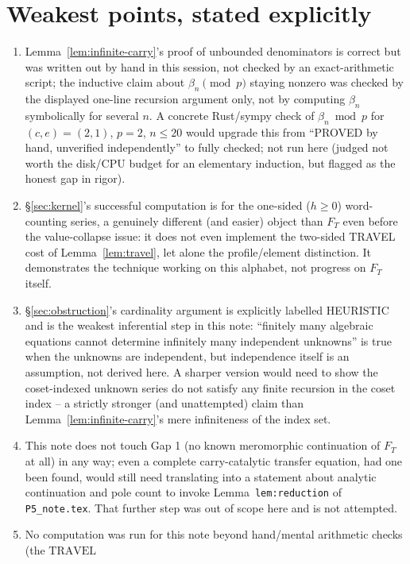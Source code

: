 \documentclass[11pt]{article}
\theoremstyle{remark}
\begin{document}
\section{Weakest points, stated explicitly}\label{sec:weak}

\begin{enumerate}
\item Lemma~\ref{lem:infinite-carry}'s proof of unbounded denominators is correct but was written out by
hand in this session, not checked by an exact-arithmetic script; the inductive claim about
$\beta_n\pmod p$ staying nonzero was checked by the displayed one-line recursion argument only, not by
computing $\beta_n$ symbolically for several $n$. A concrete Rust/sympy check of $\beta_n\bmod p$ for
$(c,e)=(2,1)$, $p=2$, $n\le20$ would upgrade this from ``PROVED by hand, unverified independently'' to
fully checked; not run here (judged not worth the disk/CPU budget for an elementary induction, but flagged
as the honest gap in rigor).
\item \S\ref{sec:kernel}'s successful computation is for the one-sided ($h\ge0$) word-counting series, a
genuinely different (and easier) object than $F_T$ even before the value-collapse issue: it does not even
implement the two-sided TRAVEL cost of Lemma~\ref{lem:travel}, let alone the profile/element distinction.
It demonstrates the technique working on this alphabet, not progress on $F_T$ itself.
\item \S\ref{sec:obstruction}'s cardinality argument is explicitly labelled HEURISTIC and is the weakest
inferential step in this note: ``finitely many algebraic equations cannot determine infinitely many
independent unknowns'' is true when the unknowns are independent, but independence itself is an assumption,
not derived here. A sharper version would need to show the coset-indexed unknown series do not satisfy any
finite recursion in the coset index -- a strictly stronger (and unattempted) claim than
Lemma~\ref{lem:infinite-carry}'s mere infiniteness of the index set.
\item This note does not touch Gap 1 (no known meromorphic continuation of $F_T$ at all) in any way; even
a complete carry-catalytic transfer equation, had one been found, would still need translating into a
statement about analytic continuation and pole count to invoke Lemma~\texttt{lem:reduction} of
\texttt{P5\_note.tex}. That further step was out of scope here and is not attempted.
\item No computation was run for this note beyond hand/mental arithmetic checks (the $\mathrm{TRAVEL}$

\end{enumerate}
\end{document}
